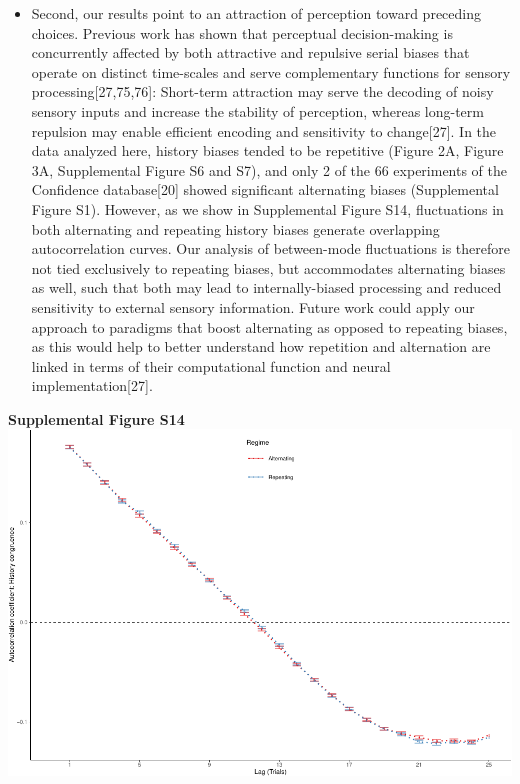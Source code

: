 \documentclass[
]{article}
\providecommand{\tightlist}{%
  \setlength{\itemsep}{0pt}\setlength{\parskip}{0pt}}
\begin{document}
\begin{itemize}
\tightlist
\item
  Second, our results point to an attraction of perception toward
  preceding choices. Previous work has shown that perceptual
  decision-making is concurrently affected by both attractive and
  repulsive serial biases that operate on distinct time-scales and serve
  complementary functions for sensory processing{[}27,75,76{]}:
  Short-term attraction may serve the decoding of noisy sensory inputs
  and increase the stability of perception, whereas long-term repulsion
  may enable efficient encoding and sensitivity to change{[}27{]}. In
  the data analyzed here, history biases tended to be repetitive (Figure
  2A, Figure 3A, Supplemental Figure S6 and S7), and only 2 of the 66
  experiments of the Confidence database{[}20{]} showed significant
  alternating biases (Supplemental Figure S1). However, as we show in
  Supplemental Figure S14, fluctuations in both alternating and
  repeating history biases generate overlapping autocorrelation curves.
  Our analysis of between-mode fluctuations is therefore not tied
  exclusively to repeating biases, but accommodates alternating biases
  as well, such that both may lead to internally-biased processing and
  reduced sensitivity to external sensory information. Future work could
  apply our approach to paradigms that boost alternating as opposed to
  repeating biases, as this would help to better understand how
  repetition and alternation are linked in terms of their computational
  function and neural implementation{[}27{]}.
\end{itemize}

\textbf{Supplemental Figure S14}
\includegraphics{modes_mouse_rev2_files/figure-latex/Supplemental_Figure_S14_print-1.pdf}
\end{document}
